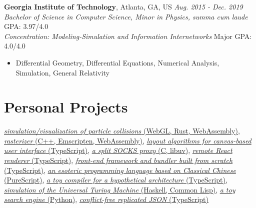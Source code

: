 \documentclass[12pt]{article}
\begin{document}
\vspace{1em}
\textbf{Georgia Institute of Technology}, Atlanta, GA, US \hfill \textit{Aug. 2015 - Dec. 2019}\\
\textit{Bachelor of Science in Computer Science, Minor in Physics, \textit{summa cum laude}} \hfill GPA: 3.97/4.0\\
\textit{Concentration: Modeling-Simulation and Information Internetworks} \hfill Major GPA: 4.0/4.0
\begin{itemize}
\item Differential Geometry, Differential Equations, Numerical Analysis, Simulation, General Relativity
\end{itemize}

\section*{Personal Projects}

\href{https://github.com/galmungral/particle-simulation}{\textit{simulation/visualization of particle collisions} (WebGL, Rust, WebAssembly)},
\href{https://github.com/galmungral/rasterizer}{\textit{rasterizer} (C++, Emscripten, WebAssembly)},
\href{https://github.com/galmungral/michelangelo}{\textit{layout algorithms for canvas-based user interface} (TypeScript)},
\href{https://github.com/galmungral/telescope}{\textit{a split SOCKS proxy} (C, libuv)}, 
\href{https://github.com/galmungral/react-teletype}{\textit{remote React renderer} (TypeScript)},
\href{https://github.com/galmungral/replay}{\textit{front-end framework and bundler built from scratch} (TypeScript)},
\href{https://github.com/galmungral/hanbun-lang}{\textit{an esoteric programming language based on Classical Chinese} (PureScript)},
\href{https://github.com/galmungral/sketchpad}{\textit{a toy compiler for a hypothetical architecture} (TypeScript)},
\href{https://github.com/galmungral/turing-machine}{\textit{simulation of the Universal Turing Machine} (Haskell, Common Lisp)},
\href{https://github.com/galmungral/plato}{\textit{a toy search engine} (Python)},
\href{https://github.com/galmungral/json-crdt}{\textit{conflict-free replicated JSON} (TypeScript)}
\end{document}
